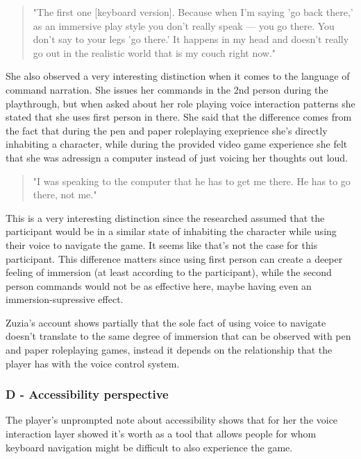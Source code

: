 \begin{quote}
    "The first one [keyboard version]. Because when I'm saying 'go back there,' as an immersive play style you don't really speak — you go there. You don't say to your legs 'go there.' It happens in my head and doesn't really go out in the realistic world that is my couch right now."
\end{quote}

She also observed a very interesting distinction when it comes to the language of command narration. She issues her commands in the 2nd person during the playthrough, but when asked about her role playing voice interaction patterns she stated that she uses first person in there. She said that the difference comes from the fact that during the pen and paper roleplaying exeprience she's directly inhabiting a character, while during the provided video game experience she felt that she was adressign a computer instead of just voicing her thoughts out loud. 

\begin{quote}
    "I was speaking to the computer that he has to get me there. He has to go there, not me."
\end{quote}

This is a very interesting distinction since the researched assumed that the participant would be in a similar state of inhabiting the character while using their voice to navigate the game. It seems like that's not the case for this participant. 
This difference matters since using first person can create a deeper feeling of immersion (at least according to the participant), while the second person commands would not be as effective here, maybe having even an immersion-supressive effect. 


Zuzia's account shows partially that the sole fact of using voice to navigate doesn't translate to the same degree of immersion that can be observed with pen and paper roleplaying games, instead it depends on the relationship that the player has with the voice control system.

\subsubsection{D - Accessibility perspective}


The player's unprompted note about accessibility shows that for her the voice interaction layer showed it's worth as a tool that allows people for whom keyboard navigation might be difficult to also experience the game.

